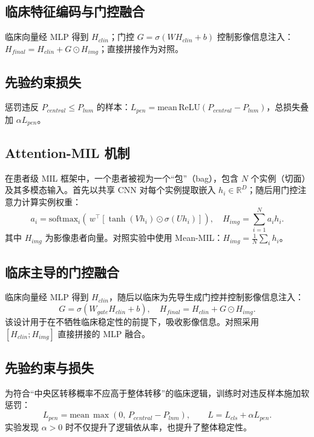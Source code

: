 \documentclass[12pt,a4paper]{ctexart}
\begin{document}
\subsection{临床特征编码与门控融合}
临床向量经 MLP 得到 $H_{clin}$；门控 $G=\sigma(W H_{clin}+b)$ 控制影像信息注入：$H_{final}=H_{clin}+G\odot H_{img}$；直接拼接作为对照。
\subsection{先验约束损失}
惩罚违反 $P_{central}\le P_{lnm}$ 的样本：$L_{pen}=\mathrm{mean}\,\mathrm{ReLU}(P_{central}-P_{lnm})$，总损失叠加 $\alpha L_{pen}$。


\subsection{Attention-MIL 机制}
在患者级 MIL 框架中，一个患者被视为一个“包”（bag），包含 $N$ 个实例（切面）及其多模态输入。首先以共享 CNN 对每个实例提取嵌入 $h_i\in\mathbb{R}^D$；随后用门控注意力计算实例权重：
\begin{equation}
 a_i = \mathrm{softmax}_i\!\left(\, w^\top\!\left[\tanh(Vh_i) \odot \sigma(Uh_i)\right] \right), \quad
 H_{img}=\sum_{i=1}^{N} a_i h_i.
\end{equation}
其中 $H_{img}$ 为影像患者向量。对照实验中使用 Mean-MIL：$H_{img}=\frac{1}{N}\sum_i h_i$。

\subsection{临床主导的门控融合}
临床向量经 MLP 得到 $H_{clin}$，随后以临床为先导生成门控并控制影像信息注入：
\begin{equation}
 G = \sigma(W_{gate}H_{clin}+b), \quad H_{final}=H_{clin}+G\odot H_{img}.
\end{equation}
该设计用于在不牺牲临床稳定性的前提下，吸收影像信息。对照采用 $[H_{clin};H_{img}]$ 直接拼接的 MLP 融合。

\subsection{先验约束与损失}
为符合“中央区转移概率不应高于整体转移”的临床逻辑，训练时对违反样本施加软惩罚：
\begin{equation}
 L_{pen}=\mathrm{mean}\,\max\!\left(0,\, P_{central}-P_{lnm}\right), \qquad
 L=L_{cls}+\alpha L_{pen}.
\end{equation}
实验发现 $\alpha>0$ 时不仅提升了逻辑依从率，也提升了整体稳定性。
\end{document}
